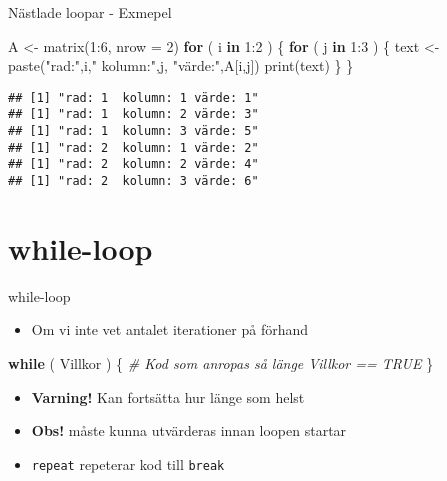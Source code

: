 \documentclass[
  11pt,
  ignorenonframetext,
]{beamer}
\newenvironment{Shaded}{\begin{snugshade}}{\end{snugshade}}
\newcommand{\AttributeTok}[1]{\textcolor[rgb]{0.77,0.63,0.00}{#1}}
\newcommand{\CommentTok}[1]{\textcolor[rgb]{0.56,0.35,0.01}{\textit{#1}}}
\newcommand{\ControlFlowTok}[1]{\textcolor[rgb]{0.13,0.29,0.53}{\textbf{#1}}}
\newcommand{\DecValTok}[1]{\textcolor[rgb]{0.00,0.00,0.81}{#1}}
\newcommand{\FunctionTok}[1]{\textcolor[rgb]{0.00,0.00,0.00}{#1}}
\newcommand{\NormalTok}[1]{#1}
\newcommand{\OtherTok}[1]{\textcolor[rgb]{0.56,0.35,0.01}{#1}}
\newcommand{\SpecialCharTok}[1]{\textcolor[rgb]{0.00,0.00,0.00}{#1}}
\newcommand{\StringTok}[1]{\textcolor[rgb]{0.31,0.60,0.02}{#1}}
\providecommand{\tightlist}{%
  \setlength{\itemsep}{0pt}\setlength{\parskip}{0pt}}
\newcommand\imp[1]{\alert{\textbf{#1}}}
\begin{document}

\begin{frame}[fragile]{Nästlade loopar - Exmepel}
\protect\hypertarget{nuxe4stlade-loopar---exmepel}{}
\begin{Shaded}
\begin{Highlighting}[]
\NormalTok{A }\OtherTok{\textless{}{-}} \FunctionTok{matrix}\NormalTok{(}\DecValTok{1}\SpecialCharTok{:}\DecValTok{6}\NormalTok{, }\AttributeTok{nrow =} \DecValTok{2}\NormalTok{)}
\ControlFlowTok{for}\NormalTok{ ( i }\ControlFlowTok{in} \DecValTok{1}\SpecialCharTok{:}\DecValTok{2}\NormalTok{ ) \{}
  \ControlFlowTok{for}\NormalTok{ ( j }\ControlFlowTok{in} \DecValTok{1}\SpecialCharTok{:}\DecValTok{3}\NormalTok{ ) \{}
\NormalTok{    text }\OtherTok{\textless{}{-}} \FunctionTok{paste}\NormalTok{(}\StringTok{"rad:"}\NormalTok{,i,}\StringTok{" kolumn:"}\NormalTok{,j,}
                  \StringTok{"värde:"}\NormalTok{,A[i,j])}
    \FunctionTok{print}\NormalTok{(text)}
\NormalTok{  \}}
\NormalTok{\}}
\end{Highlighting}
\end{Shaded}

\pause

\begin{verbatim}
## [1] "rad: 1  kolumn: 1 värde: 1"
## [1] "rad: 1  kolumn: 2 värde: 3"
## [1] "rad: 1  kolumn: 3 värde: 5"
## [1] "rad: 2  kolumn: 1 värde: 2"
## [1] "rad: 2  kolumn: 2 värde: 4"
## [1] "rad: 2  kolumn: 3 värde: 6"
\end{verbatim}
\end{frame}

\hypertarget{while-loop}{%
\section{while-loop}\label{while-loop}}


\begin{frame}[fragile]{while-loop}
\protect\hypertarget{while-loop-1}{}
\begin{itemize}
\tightlist
\item
  Om vi inte vet antalet iterationer på förhand
\end{itemize}

\begin{Shaded}
\begin{Highlighting}[]
\ControlFlowTok{while}\NormalTok{ ( Villkor ) \{}
  \CommentTok{\# Kod som anropas så länge Villkor == TRUE}
\NormalTok{\}}
\end{Highlighting}
\end{Shaded}

\begin{itemize}
\tightlist
\item
  \imp{Varning!} Kan fortsätta hur länge som helst
\item
  \imp{Obs!}  måste kunna utvärderas innan loopen startar
\item
  \texttt{repeat} repeterar kod till \texttt{break}
\end{itemize}
\end{frame}
\end{document}
